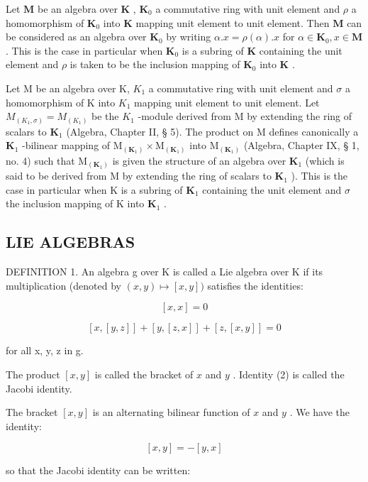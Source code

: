Let \(\mathbf{M}\) be an algebra over \(\mathbf{K}\) , \(\mathbf{K}_0\) a commutative ring with unit element and \(\rho\) a homomorphism of \(\mathbf{K}_0\) into \(\mathbf{K}\) mapping unit element to unit element. Then \(\mathbf{M}\) can be considered as an algebra over \(\mathbf{K}_0\) by writing \(\alpha.x = \rho(\alpha).x\) for \(\alpha \in \mathbf{K}_0, x \in \mathbf{M}\) . This is the case in particular when \(\mathbf{K}_0\) is a subring of \(\mathbf{K}\) containing the unit element and \(\rho\) is taken to be the inclusion mapping of \(\mathbf{K}_0\) into \(\mathbf{K}\) .

Let M be an algebra over K, \(K_{1}\) a commutative ring with unit element and \(\sigma\) a homomorphism of K into \(K_{1}\) mapping unit element to unit element. Let \(M_{(K_{1},\sigma)} = M_{(K_{1})}\) be the \(K_{1}\) -module derived from M by extending the ring of scalars to \(\mathbf{K}_1\) (Algebra, Chapter II, § 5). The product on M defines canonically a \(\mathbf{K}_1\) -bilinear mapping of \(\mathrm{M}_{(\mathbf{K}_1)} \times \mathrm{M}_{(\mathbf{K}_1)}\) into \(\mathrm{M}_{(\mathbf{K}_1)}\) (Algebra, Chapter IX, § 1, no. 4) such that \(\mathrm{M}_{(\mathbf{K}_1)}\) is given the structure of an algebra over \(\mathbf{K}_1\) (which is said to be derived from M by extending the ring of scalars to \(\mathbf{K}_1\) ). This is the case in particular when K is a subring of \(\mathbf{K}_1\) containing the unit element and \(\sigma\) the inclusion mapping of K into \(\mathbf{K}_1\) .

\subsection{LIE ALGEBRAS}

DEFINITION 1. An algebra g over K is called a Lie algebra over K if its multiplication (denoted by \((x,y)\mapsto [x,y])\) satisfies the identities:

\[
[ x, x ] = 0\tag{1}
\]

\[
[ x, [ y, z ] ] + [ y, [ z, x ] ] + [ z, [ x, y ] ] = 0\tag{2}
\]

for all x, y, z in g.

The product \([x, y]\) is called the bracket of \(x\) and \(y\) . Identity (2) is called the Jacobi identity.

The bracket \([x, y]\) is an alternating bilinear function of \(x\) and \(y\) . We have the identity:

\[
[ x, y ] = - [ y, x ]\tag{3}
\]

so that the Jacobi identity can be written:

